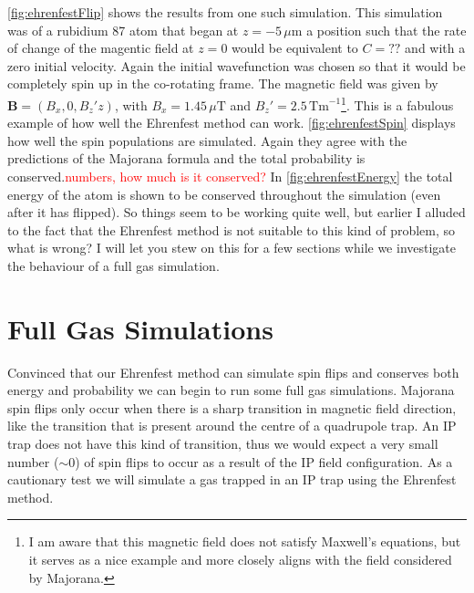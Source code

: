 \autoref{fig:ehrenfestFlip} shows the results from one such simulation.
This simulation was of a rubidium 87 atom that began at \st{$z=-5\,\mu\mathrm{m}$} a position such that the rate of change of the magentic field at $z=0$ would be equivalent to $C=??$ and with a zero initial velocity.
Again the initial wavefunction was chosen so that it would be completely spin up in the co-rotating frame.
The magnetic field was given by $\mathbf{B} = (B_x,0,B_z'z)$, with $B_x=1.45\,\mu\mathrm{T}$ and $B_z'=2.5\,\mathrm{Tm}^{-1}$\footnote{I am aware that this magnetic field does not satisfy Maxwell's equations, but it serves as a nice example and more closely aligns with the field considered by Majorana.}.
This is a fabulous example of how well the Ehrenfest method can work.
\autoref{fig:ehrenfestSpin} displays how well the spin populations are simulated.
Again they agree with the predictions of the Majorana formula and the total probability is conserved.\textcolor{red}{numbers, how much is it conserved?}
In \autoref{fig:ehrenfestEnergy} the total energy of the atom is shown to be conserved throughout the simulation (even after it has flipped).
So things seem to be working quite well, but earlier I alluded to the fact that the Ehrenfest method is not suitable to this kind of problem, so what is wrong?
I will let you stew on this for a few sections while we investigate the behaviour of a full gas simulation.


\section{Full Gas Simulations}

Convinced that our Ehrenfest method can simulate spin flips and conserves both energy and probability we can begin to run some full gas simulations.
Majorana spin flips only occur when there is a sharp transition in magnetic field direction, like the transition that is present around the centre of a quadrupole trap.
An IP trap does not have this kind of transition, thus we would expect a very small number ($\sim 0$) of spin flips to occur as a result of the IP field configuration.
As a cautionary test we will simulate a gas trapped in an IP trap using the Ehrenfest method.


